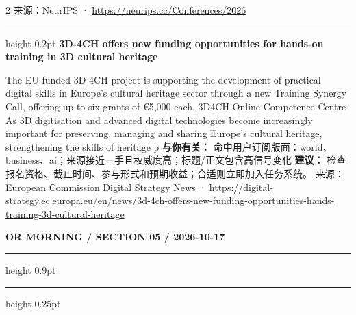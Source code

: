 \documentclass[10.5pt]{ctexart}
\begin{document}
\begin{multicols}{2}
{\footnotesize\color{ormuted} 来源：NeurIPS · \url{https://neurips.cc/Conferences/2026}}
\vspace{2mm}
\hrule height 0.2pt
\vspace{2mm}
{\large\bfseries 3D-4CH offers new funding opportunities for hands-on training in 3D cultural heritage}\par
The EU-funded 3D-4CH project is supporting the development of practical digital skills in Europe's cultural heritage sector through a new Training Synergy Call, offering up to six grants of €5,000 each. 3D4CH Online Competence Centre As 3D digitisation and advanced digital technologies become increasingly important for preserving, managing and sharing Europe's cultural heritage, strengthening the skills of heritage p
\textbf{与你有关：} 命中用户订阅版面：world、business、ai；来源接近一手且权威度高；标题/正文包含高信号变化
\textbf{建议：} 检查报名资格、截止时间、参与形式和预期收益；合适则立即加入任务系统。
{\footnotesize\color{ormuted} 来源：European Commission Digital Strategy News · \url{https://digital-strategy.ec.europa.eu/en/news/3d-4ch-offers-new-funding-opportunities-hands-training-3d-cultural-heritage}}
\end{multicols}
\newpage
{\small\bfseries OR MORNING / SECTION 05 / 2026-10-17}
\vspace{2mm}
\hrule height 0.9pt
\vspace{1.5mm}
\hrule height 0.25pt
\vspace{4mm}
\end{document}
